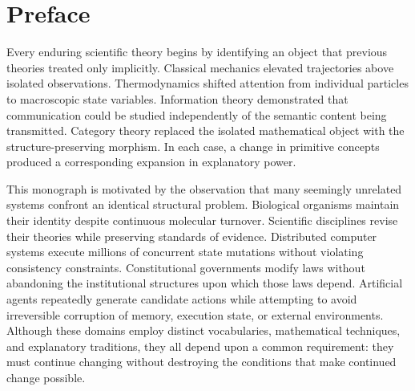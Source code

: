 \documentclass[11pt]{book}
\numberwithin{equation}{chapter}
\theoremstyle{definition}
\theoremstyle{plain}
\begin{document}
\begin{abstract}
The resulting theory is intentionally domain-independent. Physical conservation laws, biological homeostasis, logical consistency, computational correctness, institutional stability, scientific methodology, and artificial intelligence are treated as distinct realizations of a common mathematical structure in which persistence depends upon the preservation of invariant relations under successive transformations. Modern agentic software architectures appear not as the primary subject of the theory but as contemporary examples of a broader class of admissibility-preserving systems whose emergence reflects the increasing necessity of separating unconstrained proposal generation from warranted state commitment.

The central claim of this work is that persistence cannot be understood solely in terms of reachable states, optimal actions, or generated outputs. It is fundamentally a property of admissible trajectories through structured state spaces. Intelligence, adaptation, and long-term viability consequently emerge not from the unrestricted capacity to generate possibilities but from the disciplined preservation of those invariant conditions that permit meaningful continuation across time.

\end{abstract}

\newpage
\tableofcontents

\mainmatter

\chapter*{Preface}

Every enduring scientific theory begins by identifying an object that previous theories treated only implicitly. Classical mechanics elevated trajectories above isolated observations. Thermodynamics shifted attention from individual particles to macroscopic state variables. Information theory demonstrated that communication could be studied independently of the semantic content being transmitted. Category theory replaced the isolated mathematical object with the structure-preserving morphism. In each case, a change in primitive concepts produced a corresponding expansion in explanatory power.

This monograph is motivated by the observation that many seemingly unrelated systems confront an identical structural problem. Biological organisms maintain their identity despite continuous molecular turnover. Scientific disciplines revise their theories while preserving standards of evidence. Distributed computer systems execute millions of concurrent state mutations without violating consistency constraints. Constitutional governments modify laws without abandoning the institutional structures upon which those laws depend. Artificial agents repeatedly generate candidate actions while attempting to avoid irreversible corruption of memory, execution state, or external environments. Although these domains employ distinct vocabularies, mathematical techniques, and explanatory traditions, they all depend upon a common requirement: they must continue changing without destroying the conditions that make continued change possible.
\end{document}
